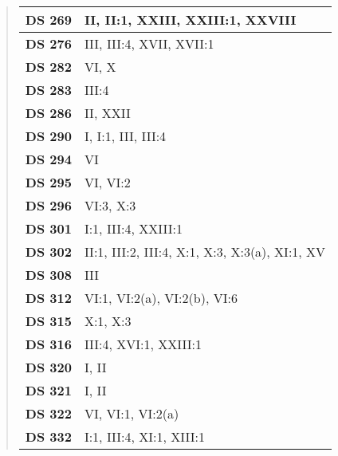 \begin{quote}
\begin{xltabular}{\linewidth}{ l | X }
        \textbf {DS 269} & II, II:1, XXIII, XXIII:1, XXVIII \\ \hline
    
        \textbf {DS 276} & III, III:4, XVII, XVII:1 \\ \hline
    
        \textbf {DS 282} & VI, X \\ \hline
    
        \textbf {DS 283} & III:4 \\ \hline
    
        \textbf {DS 286} & II, XXII \\ \hline
    
        \textbf {DS 290} & I, I:1, III, III:4 \\ \hline
    
        \textbf {DS 294} & VI \\ \hline
    
        \textbf {DS 295} & VI, VI:2 \\ \hline
    
        \textbf {DS 296} & VI:3, X:3 \\ \hline
    
        \textbf {DS 301} & I:1, III:4, XXIII:1 \\ \hline
    
        \textbf {DS 302} & II:1, III:2, III:4, X:1, X:3, X:3(a), XI:1, XV \\ \hline
    
        \textbf {DS 308} & III \\ \hline
    
        \textbf {DS 312} & VI:1, VI:2(a), VI:2(b), VI:6 \\ \hline
    
        \textbf {DS 315} & X:1, X:3 \\ \hline
    
        \textbf {DS 316} & III:4, XVI:1, XXIII:1 \\ \hline
    
        \textbf {DS 320} & I, II \\ \hline
    
        \textbf {DS 321} & I, II \\ \hline
    
        \textbf {DS 322} & VI, VI:1, VI:2(a) \\ \hline
    
        \textbf {DS 332} & I:1, III:4, XI:1, XIII:1 \\ \hline
    

\end{xltabular}
\end{quote}
